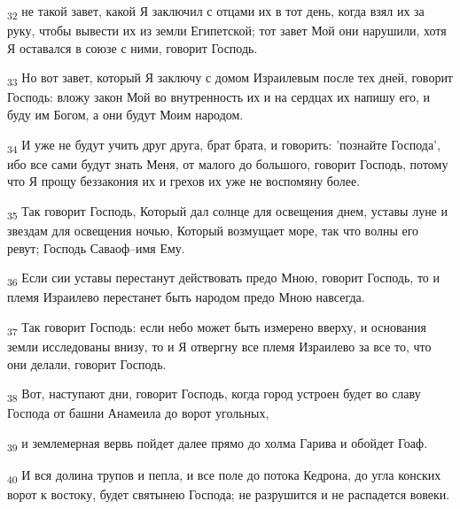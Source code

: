 \begin{tcolorbox}
\textsubscript{32} не такой завет, какой Я заключил с отцами их в тот день, когда взял их за руку, чтобы вывести их из земли Египетской; тот завет Мой они нарушили, хотя Я оставался в союзе с ними, говорит Господь.
\end{tcolorbox}
\begin{tcolorbox}
\textsubscript{33} Но вот завет, который Я заключу с домом Израилевым после тех дней, говорит Господь: вложу закон Мой во внутренность их и на сердцах их напишу его, и буду им Богом, а они будут Моим народом.
\end{tcolorbox}
\begin{tcolorbox}
\textsubscript{34} И уже не будут учить друг друга, брат брата, и говорить: 'познайте Господа', ибо все сами будут знать Меня, от малого до большого, говорит Господь, потому что Я прощу беззакония их и грехов их уже не воспомяну более.
\end{tcolorbox}
\begin{tcolorbox}
\textsubscript{35} Так говорит Господь, Который дал солнце для освещения днем, уставы луне и звездам для освещения ночью, Который возмущает море, так что волны его ревут; Господь Саваоф--имя Ему.
\end{tcolorbox}
\begin{tcolorbox}
\textsubscript{36} Если сии уставы перестанут действовать предо Мною, говорит Господь, то и племя Израилево перестанет быть народом предо Мною навсегда.
\end{tcolorbox}
\begin{tcolorbox}
\textsubscript{37} Так говорит Господь: если небо может быть измерено вверху, и основания земли исследованы внизу, то и Я отвергну все племя Израилево за все то, что они делали, говорит Господь.
\end{tcolorbox}
\begin{tcolorbox}
\textsubscript{38} Вот, наступают дни, говорит Господь, когда город устроен будет во славу Господа от башни Анамеила до ворот угольных,
\end{tcolorbox}
\begin{tcolorbox}
\textsubscript{39} и землемерная вервь пойдет далее прямо до холма Гарива и обойдет Гоаф.
\end{tcolorbox}
\begin{tcolorbox}
\textsubscript{40} И вся долина трупов и пепла, и все поле до потока Кедрона, до угла конских ворот к востоку, будет святынею Господа; не разрушится и не распадется вовеки.
\end{tcolorbox}
